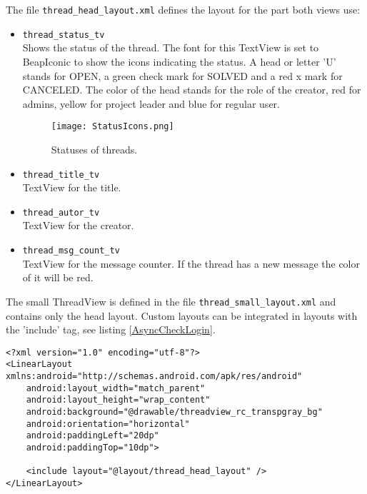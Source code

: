 \documentclass[12pt,a4paper,oneside]{report}
\newcommand{\code}[1]{\lstinline{#1}}
\begin{document}
The file \code{thread_head_layout.xml} defines the layout for the part both views use:
\begin{itemize}
\item \code{thread_status_tv}\\
Shows the status of the thread. The font for this TextView is set to BeapIconic to show the icons indicating the status. A head or letter 'U' stands for OPEN, a green check mark for SOLVED and a red x mark for CANCELED. The color of the head stands for the role of the creator, red for admins, yellow for project leader and blue for regular user. 
\begin{figure}[!ht]
	\centering
    \texttt{[image: StatusIcons.png]}
	\caption{Statuses of threads.}
\end{figure}

\item \code{thread_title_tv}\\
TextView for the title.

\item \code{thread_autor_tv}\\
TextView for the creator.

\item \code{thread_msg_count_tv}\\
TextView for the message counter. If the thread has a new message the color of it will be red.

\end{itemize}
The small ThreadView is defined in the file \code{thread_small_layout.xml} and contains only the head layout. Custom layouts can be integrated in layouts with the 'include' tag, see listing \ref{AsyncCheckLogin}.

\begin{lstlisting}[caption=Thread small layout, label=lst:ThreadSmallLayout]
<?xml version="1.0" encoding="utf-8"?>
<LinearLayout xmlns:android="http://schemas.android.com/apk/res/android"
    android:layout_width="match_parent"
    android:layout_height="wrap_content"
    android:background="@drawable/threadview_rc_transpgray_bg"
    android:orientation="horizontal"
    android:paddingLeft="20dp"
    android:paddingTop="10dp">

    <include layout="@layout/thread_head_layout" />
</LinearLayout>
\end{lstlisting}
\end{document}
